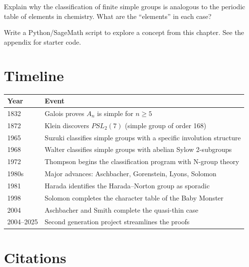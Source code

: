 \begin{exercise}
Explain why the classification of finite simple groups is analogous to the periodic table of elements in chemistry. What are the ``elements'' in each case?
\end{exercise}


\begin{exercise}[Computational]
Write a Python/SageMath script to explore a concept from this chapter. See the appendix for starter code.
\end{exercise}

\section{Timeline}

\begin{tabularx}{\linewidth}{lX}
\toprule
\textbf{Year} & \textbf{Event} \\ \midrule
1832 & Galois proves $A_n$ is simple for $n \geq 5$ \cite{galois1832} \\ 
1872 & Klein discovers $PSL_2(7)$ (simple group of order 168) \cite{klein1872} \\ 
1965 & Suzuki classifies simple groups with a specific involution structure \cite{suzuki1965} \\ 
1968 & Walter classifies simple groups with abelian Sylow 2-subgroups \cite{walter1968} \\ 
1972 & Thompson begins the classification program with N-group theory \cite{thompson1972} \\ 
1980s & Major advances: Aschbacher, Gorenstein, Lyons, Solomon \cite{gls1994} \\ 
1981 & Harada identifies the Harada--Norton group as sporadic \cite{harada1981} \\ 
1998 & Solomon completes the character table of the Baby Monster \cite{solomon1998} \\ 
2004 & Aschbacher and Smith complete the quasi-thin case \cite{aschbacher2004} \\ 
2004--2025 & Second generation project streamlines the proofs \cite{gls1994} \\ \bottomrule
\end{tabularx}

\section{Citations}

